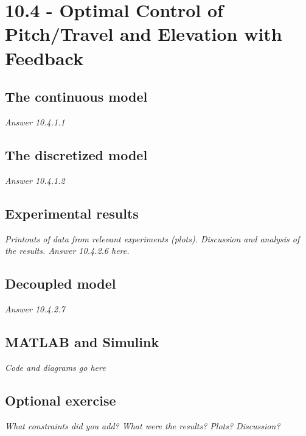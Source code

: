 \section{10.4 - Optimal Control of Pitch/Travel and Elevation with Feedback}

\subsection{The continuous model}
\textit{Answer 10.4.1.1}

\subsection{The discretized model}
\textit{Answer 10.4.1.2}

\subsection{Experimental results}
\textit{Printouts of data from relevant experiments (plots).
Discussion and analysis of the results.
Answer 10.4.2.6 here.}

\subsection{Decoupled model}
\textit{Answer 10.4.2.7}

\subsection{MATLAB and Simulink}
\textit{Code and diagrams go here}

\subsection{Optional exercise}
\textit{What constraints did you add? What were the results? Plots? Discussion?}
	
	
	
	
	
	
	
	
	
	
	
	
	 
	
